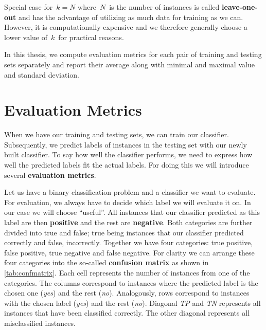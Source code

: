 Special case for~$k=N$ where~$N$~is the number of instances is called {\bf leave-one-out}
and has the advantage of 
utilizing as much data for training as we can.
However, it is computationally expensive and
we therefore generally choose a lower value of~$k$~for practical reasons.

In this thesis, we compute evaluation metrics for each pair of training and testing sets separately
and report their average along with minimal and maximal value and standard deviation.


\section{Evaluation Metrics}

When we have our training and testing sets, we can train our classifier.
Subsequently, we predict labels of instances in the testing set with our newly
built classifier.
To say how well the classifier performs, we need to express how well the predicted
labels fit the actual labels.
For doing this we will introduce several {\bf evaluation metrics}.

Let us have a binary classification problem and a classifier we want to evaluate.
For evaluation, we always have to decide which label we will evaluate it on.
In our case we will choose ``useful''.
All instances that our classifier predicted as this label are then {\bf positive} 
and the rest are {\bf negative}.
Both categories are further divided into true and false;
true being instances that our classifier predicted correctly and false, incorrectly.
Together we have four categories:
true positive, false positive, true negative and false negative.
For clarity we can arrange these four categories into the so-called {\bf confusion matrix} 
as shown in \autoref{tab:confmatrix}.
Each cell represents the number of instances from one of the categories.
The columns correspond to instances where the predicted label is the chosen one (\textit{yes}) and the rest (\textit{no}).
Analogously, rows correspond to instances with the chosen label (\textit{yes}) and the rest (\textit{no}).
Diagonal {\it TP} and {\it TN} represents all instances that have been classified correctly.
The other diagonal represents all misclassified instances.




